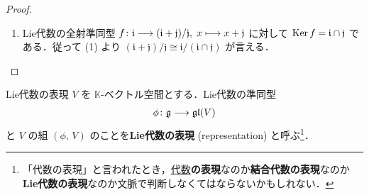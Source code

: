 \documentclass[rep_main]{subfiles}
\begin{document}
\begin{proof}
\begin{enumerate}
        　さて，Lie代数の全射準同型 $f \colon \mathfrak{g}/\mathfrak{i} \lto \mathfrak{g}/\mathfrak{j},\; x + \mathfrak{i} \lmto x + \mathfrak{j}$ は仮定よりwell-definedで\footnote{$x + \mathfrak{i} = x' + \mathfrak{i} \IMP x' - x \in \mathfrak{i} \subset \mathfrak{j} \IMP f(x' + \mathfrak{i}) = (x + (x' - x)) + \mathfrak{j} = x + \mathfrak{j} = f(x + \mathfrak{i})$} ，かつ $\Ker f = \mathfrak{j} / \mathfrak{i}$ である．従って (1) より $ \mathfrak{g} / \mathfrak{j} \cong (\mathfrak{g}/ \mathfrak{i}) / (\mathfrak{j} / \mathfrak{i})$ が言える．
        \item Lie代数の全射準同型 $f \colon \mathfrak{i} \longrightarrow (\mathfrak{i} + \mathfrak{j}) / \mathfrak{j},\; x \longmapsto x + \mathfrak{j}$ に対して $\operatorname{Ker} f = \mathfrak{i} \cap \mathfrak{j}$ である．従って (1) より $(\mathfrak{i} + \mathfrak{j}) / \mathfrak{j} \cong \mathfrak{i} / (\mathfrak{i} \cap \mathfrak{j})$ が言える．
    \end{enumerate}
\end{proof}


\begin{mydef}[label=def:rep-LieAlg]{Lie代数の表現}
    $V$ を $\mathbb{K}$-ベクトル空間とする．Lie代数の準同型
    \begin{align}
        \phi \colon \mathfrak{g} \longrightarrow \mathfrak{gl} (V)
    \end{align}
    と $V$ の組 $(\phi,\, V)$ のことを\textbf{Lie代数の表現} (representation) と呼ぶ\footnote{「代数の表現」と言われたとき，\hyperref[ax:Alg]{代数}\textbf{の表現}なのか\textbf{結合代数の表現}なのか\textbf{Lie代数の表現}なのか文脈で判断しなくてはならないかもしれない．}．
\end{mydef}
\end{document}
